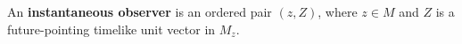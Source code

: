 An \textbf{instantaneous observer} is an ordered pair $(z, Z)$, where $z \in M$ and $Z$ is a future-pointing timelike unit vector in $M_z$.
